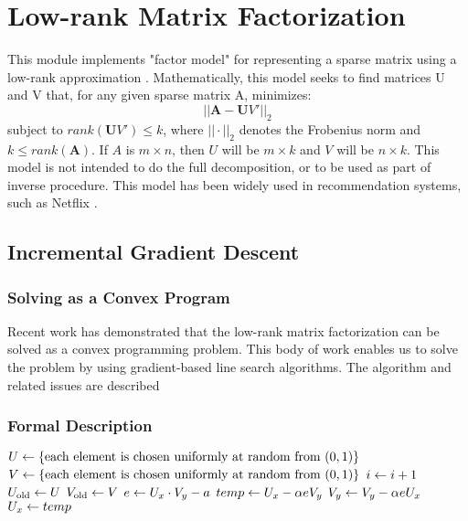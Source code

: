 
\chapter{Low-rank Matrix Factorization}

This module implements "factor model" for representing a sparse matrix using a low-rank approximation \cite{DBLP:conf/icml/SrebroJ03}.
Mathematically, this model seeks to find matrices U and V that, for any given sparse matrix A, minimizes:
\[ ||\boldsymbol A - \boldsymbol UV' ||_2 \]
subject to $rank(\boldsymbol UV') \leq k$, where $||\cdot||_2$ denotes the Frobenius norm and $k \leq rank(\boldsymbol A)$.
If $A$ is $m \times n$, then $U$ will be $m \times k$ and $V$ will be $n \times k$.
This model is not intended to do the full decomposition, or to be used as part of inverse procedure.
This model has been widely used in recommendation systems, such as Netflix \cite{:TheNetflixPrize07}.

\section{Incremental Gradient Descent}

\subsection{Solving as a Convex Program}
Recent work \cite{DBLP:journals/cacm/CandesR12, DBLP:journals/siamrev/RechtFP10} has demonstrated that the low-rank matrix factorization can be solved as a convex programming problem.
This body of work enables us to solve the problem by using gradient-based line search algorithms. The algorithm and related issues are described

\subsection{Formal Description}
\begin{algorithm} \label{alg:igd-lmf}
\begin{algorithmic}[1]
	\State $U \leftarrow \{ \text{each element is chosen uniformly at random from } (0, 1) \}$
	\State $V \leftarrow \{ \text{each element is chosen uniformly at random from } (0, 1) \}$
	\Repeat
		\State $i \leftarrow i + 1$
		\State $U_\text{old} \leftarrow U$
		\State $V_\text{old} \leftarrow V$
			\State $e \leftarrow U_x \cdot V_y - a$
			\State $temp \leftarrow U_x - \alpha e V_y$
			\State $V_y \leftarrow V_y - \alpha e U_x$
			\State $U_x \leftarrow temp$
		\EndFor
\end{algorithmic}
\end{algorithm}

